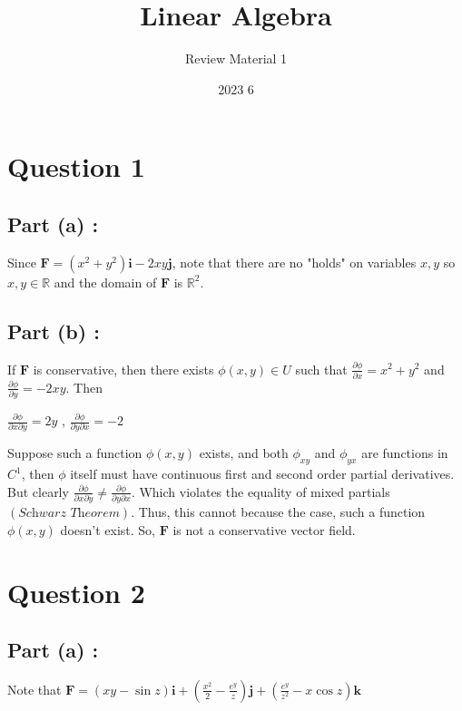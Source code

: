 \documentclass[12pt]{article}
\title{Linear Algebra}
\author{Review Material 1}
\date{2023 6}
\renewcommand{\vec}[1]{\boldsymbol{#1}}
\begin{document}
\doublespacing

\section*{Question 1}

\subsection*{Part (a) :}
Since $ \vec {F} = (x^2 + y^2) \vec i - 2xy \vec j$, 
note that there are no "holds" on 
variables $x,y$ so $x,y \in \mathbb{R}$ and the 
domain of $\vec F$ is $\mathbb{R}^2$.

\subsection*{Part (b) :}
If $\vec F$ is conservative, then there exists
 $\phi(x,y) \in U$ such that 
$\displaystyle{\frac{\partial \phi}{\partial x} =
x^2 + y^2}$ and $\displaystyle
{\frac{\partial \phi}{\partial y} =-2xy}$. Then

\begin{center}
    $\displaystyle
    {\frac{\partial \phi}{\partial x \partial y} =
    2y}$ , $\displaystyle
    {\frac{\partial \phi}{\partial y \partial x} 
    =-2}$
\end{center}

Suppose such a function $\phi(x,y)$ exists, and both
$\phi_{xy}$ and $\phi_{yx}$ are functions in $C^1$,
then $\phi$ itself must have continuous first and 
second order partial derivatives. But clearly
$\displaystyle
    {\frac{\partial \phi}{\partial x \partial y} 
     \neq \frac{\partial \phi}{\partial y \partial x} 
    }$.
Which violates the equality of mixed partials
$(\textit{Schwarz Theorem})$. Thus, this cannot because
the case, such a function $\phi(x,y)$ doesn't exist.
So, $\vec F $ is not a conservative vector field.


\newpage
\section*{Question 2}
\subsection*{Part (a) :}

\begin{center}
    Note that 
    $\vec F = \displaystyle{(xy - \sin z) \vec i
    + \left( \frac{x^2}{2} - \frac{e^y}{z} \right)
    \vec j + \left( \frac{e^y}{z^2} - x \cos z \right)
    \vec k}$
\end{center}
\end{document}
